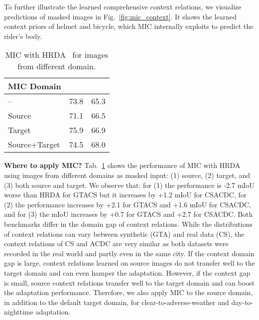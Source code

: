 \documentclass[10pt,twocolumn,letterpaper]{article}
\begin{document}
To further illustrate the learned
comprehensive context relations, we visualize predictions of
masked images in Fig.~\ref{fig:mic_context}. It shows the learned context
priors of helmet and bicycle, which MIC internally
exploits to predict the rider’s body.

\begin{table}[tb]
\centering
\caption{MIC with HRDA~\cite{hoyer2022hrda} for images from different domain.}
\label{tab:mic_domain}
\setlength{\tabcolsep}{5pt}
\scriptsize

\begin{tabular}{lcc}
\hline
   MIC Domain &  &  \\
\hline\hline
           -- &    73.8 &             65.3 \\
       Source &    71.1 &             66.5 \\
       Target &    75.9 &             66.9 \\
Source+Target &    74.5 &             68.0 \\
\hline
\end{tabular}

\end{table}
 
\noindent\textbf{Where to apply MIC?}
Tab.~\ref{tab:mic_domain} shows the performance of MIC with HRDA using images from different domains as masked input: (1) source, (2) target, and (3) both source and target. We observe that: for (1) the performance is \mbox{-2.7} mIoU worse than HRDA for GTACS but it increases by +1.2 mIoU for CSACDC, for (2) the performance increases by +2.1 for GTACS and +1.6 mIoU for CSACDC, and for (3) the mIoU increases by +0.7 for GTACS and +2.7 for CSACDC. Both benchmarks differ in the domain gap of context relations. While the distributions of context relations can vary between synthetic (GTA) and real data (CS), the context relations of CS and ACDC are very similar as both datasets were recorded in the real world and partly even in the same city. If the context domain gap is large, context relations learned on source images do not transfer well to the target domain and can even hamper the adaptation. However, if the context gap is small, source context relations transfer well to the target domain and can boost the adaptation performance.
Therefore, we also apply MIC to the source domain, in addition to the default target domain, for clear-to-adverse-weather and day-to-nighttime adaptation.
\end{document}
